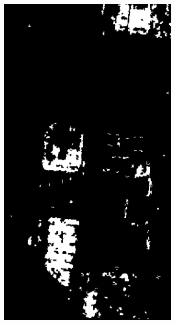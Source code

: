 \begin{figure}[t]
\begin{subfigure}[b]{0.23\columnwidth}
		\includegraphics[width=\textwidth]{Figures/CD/OP_1_A2}
		\caption{}
		\label{fig:3_c}
\end{subfigure}


\end{figure}
